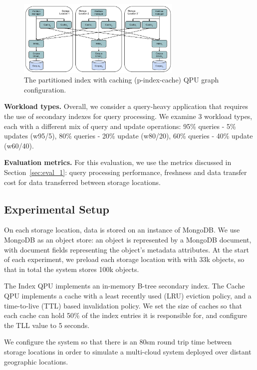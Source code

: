 \begin{figure}[H]
\centering
  \includegraphics[width=0.7\textwidth]{./figures/evaluation/p_index_cache.pdf}
  \caption{The partitioned index with caching (p-index-cache) QPU graph configuration.}
  \label{fig:p_index_cache}
\end{figure}

\bigskip
\noindent
\textbf{Workload types.}
Overall, we consider a query-heavy application that requires the use of secondary indexes for query processing.
We examine 3 workload types, each with a different mix of query and update operations:
95\% queries - 5\% updates (w95/5), 80\% queries - 20\% update (w80/20),
60\% queries - 40\% update (w60/40).

\bigskip
\noindent
\textbf{Evaluation metrics.}
For this evaluation, we use the metrics discussed in Section~\ref{sec:eval_1}:
query processing performance, freshness and data transfer cost for data transferred between storage locations.

\subsection{Experimental Setup}
On each storage location, data is stored on an instance of MongoDB.
We use MongoDB as an object store:
an object is represented by a MongoDB document, with document fields representing the object's metadata attributes.
At the start of each experiment, we preload each storage location with with 33k objects,
so that in total the system stores 100k objects.

The Index QPU implements an in-memory B-tree secondary index.
The Cache QPU implements a cache with a least recently used (LRU) eviction policy,
and a time-to-live (TTL) based invalidation policy.
We set the size of caches so that each cache can hold 50\% of the index entries it is responsible for,
and configure the TLL value to 5 seconds.

We configure the system so that there is an 80sm round trip time between storage locations in order to
simulate a multi-cloud system deployed over distant geographic locations.

